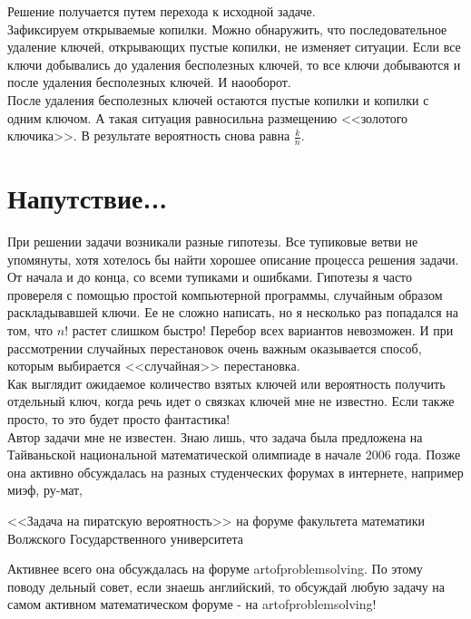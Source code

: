 \documentclass[pdftex,12pt,a4paper]{article}
\begin{document}
Решение получается путем перехода к исходной задаче. \\
Зафиксируем открываемые копилки. Можно обнаружить, что
последовательное удаление ключей, открывающих пустые копилки, не
изменяет ситуации. Если все ключи добывались до удаления
бесполезных ключей, то все ключи добываются и после удаления
бесполезных ключей. И наооборот. \\
После удаления бесполезных ключей остаются пустые копилки и
копилки с одним ключом. А такая ситуация равносильна размещению
<<золотого ключика>>. В результате вероятность снова равна
$\frac{k}{n}$. \\



\section{Напутствие...}
При решении задачи возникали разные гипотезы. Все тупиковые ветви не упомянуты, хотя хотелось бы найти хорошее описание процесса решения задачи. От начала и до конца, со всеми тупиками и ошибками. 
Гипотезы я часто провереля с помощью простой компьютерной программы, случайным образом раскладывавшей ключи. Ее не сложно написать, но я несколько раз попадался на том, что  $n!$ растет слишком быстро! Перебор всех вариантов невозможен. И при рассмотрении случайных перестановок очень важным оказывается способ, которым выбирается <<случайная>> перестановка. \\

Как выглядит ожидаемое количество взятых ключей или вероятность
получить отдельный ключ, когда речь идет о связках ключей мне не
известно. Если также просто, то это будет просто фантастика! \\


Автор задачи мне не известен. Знаю лишь, что задача была
предложена на Тайваньской национальной математической олимпиаде в
начале 2006 года. Позже она активно обсуждалась на разных студенческих форумах в интернете, например миэф, ру-мат, 

<<Задача на пиратскую вероятность>> на форуме факультета математики Волжского Государственного университета 

Активнее всего она обсуждалась на форуме artofproblemsolving. По этому поводу дельный совет, если знаешь английский, то обсуждай любую задачу на самом активном математическом форуме - на artofproblemsolving!
\end{document}
